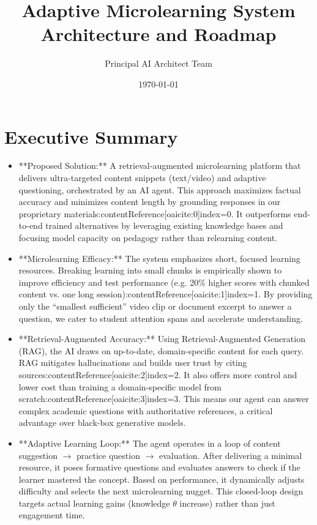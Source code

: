 \documentclass[11pt]{article}
\begin{document}
\title{Adaptive Microlearning System Architecture and Roadmap}
\author{Principal AI Architect Team}
\date{\today}
\maketitle

\tableofcontents
\newpage

\section{Executive Summary}
\begin{itemize}
    \item **Proposed Solution:** A retrieval-augmented microlearning platform that delivers ultra-targeted content snippets (text/video) and adaptive questioning, orchestrated by an AI agent. This approach maximizes factual accuracy and minimizes content length by grounding responses in our proprietary materials:contentReference[oaicite:0]{index=0}. It outperforms end-to-end trained alternatives by leveraging existing knowledge bases and focusing model capacity on pedagogy rather than relearning content.
    \item **Microlearning Efficacy:** The system emphasizes short, focused learning resources. Breaking learning into small chunks is empirically shown to improve efficiency and test performance (e.g. 20\% higher scores with chunked content vs. one long session):contentReference[oaicite:1]{index=1}. By providing only the “smallest sufficient” video clip or document excerpt to answer a question, we cater to student attention spans and accelerate understanding.
    \item **Retrieval-Augmented Accuracy:** Using Retrieval-Augmented Generation (RAG), the AI draws on up-to-date, domain-specific content for each query. RAG mitigates hallucinations and builds user trust by citing sources:contentReference[oaicite:2]{index=2}. It also offers more control and lower cost than training a domain-specific model from scratch:contentReference[oaicite:3]{index=3}. This means our agent can answer complex academic questions with authoritative references, a critical advantage over black-box generative models.
    \item **Adaptive Learning Loop:** The agent operates in a loop of content suggestion $\to$ practice question $\to$ evaluation. After delivering a minimal resource, it poses formative questions and evaluates answers to check if the learner mastered the concept. Based on performance, it dynamically adjusts difficulty and selects the next microlearning nugget. This closed-loop design targets actual learning gains (knowledge $\theta$ increase) rather than just engagement time.

\end{itemize}
\end{document}
